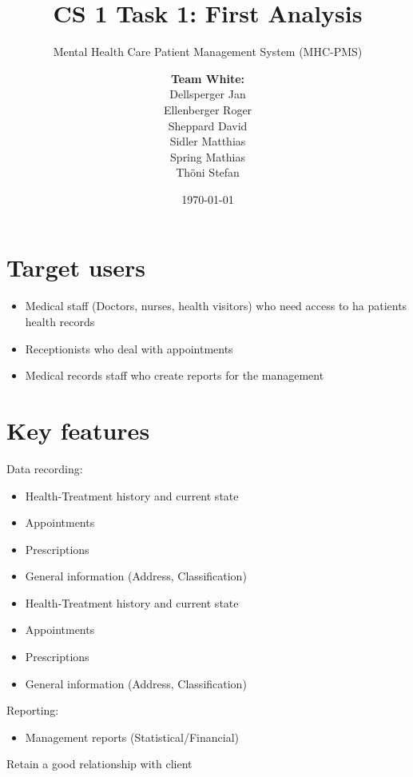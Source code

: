 \documentclass[a4paper]{scrreprt}
\title{CS 1 Task 1: First Analysis}
\subtitle{Mental Health Care Patient Management System (MHC-PMS)}
\author{
\begin{tabular}{l}
\normalfont\bfseries{Team White:}\\
Dellsperger Jan\\
Ellenberger Roger\\
Sheppard David\\
Sidler Matthias\\
Spring Mathias\\
Thöni Stefan
\end{tabular}
}
\date{\today}
\begin{document}
\begin{titlepage}
	\maketitle
\end{titlepage}




\section*{Target users}
\begin{itemize}
\item Medical staff (Doctors, nurses, health visitors) who need access to ha patients health records
\item Receptionists who deal with appointments
\item Medical records staff who create reports for the management
\end{itemize}






\section*{Key features}

Data recording:

\begin{itemize}
\item Health-Treatment history and current state
\item Appointments
\item Prescriptions
\item General information (Address, Classification)
\end{itemize}

\begin{itemize}
\item Health-Treatment history and current state
\item Appointments 
\item Prescriptions
\item General information (Address, Classification)
\end{itemize}

Reporting:

\begin{itemize}
\item Management reports (Statistical/Financial) 
\end{itemize}Retain a good relationship with client
\end{document}
